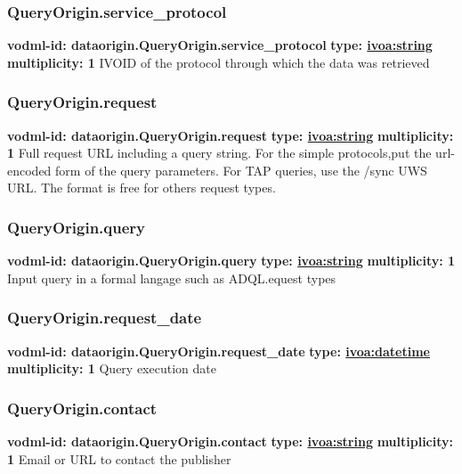     \subsubsection{QueryOrigin.service\_protocol}
      \textbf{vodml-id: dataorigin.QueryOrigin.service\_protocol} \newline
      \textbf{type: \hyperref[sect:ivoa]{ivoa:string}} \newline
      \textbf{multiplicity: 1} \newline
      IVOID \citep{2007ivoa.spec.0314P} of the protocol through which the data was retrieved

    \subsubsection{QueryOrigin.request}
      \textbf{vodml-id: dataorigin.QueryOrigin.request} \newline
      \textbf{type: \hyperref[sect:ivoa]{ivoa:string}} \newline
      \textbf{multiplicity: 1} \newline
      Full request URL including a query string. For the simple protocols,put the url-encoded form of the query parameters. For TAP queries, use the /sync UWS \citep{2016ivoa.spec.1024H} URL. The format is free for others request types.

    \subsubsection{QueryOrigin.query}
      \textbf{vodml-id: dataorigin.QueryOrigin.query} \newline
      \textbf{type: \hyperref[sect:ivoa]{ivoa:string}} \newline
      \textbf{multiplicity: 1} \newline
      Input query in a formal langage such as ADQL.equest types \citep{2023ivoa.spec.1215M}

    \subsubsection{QueryOrigin.request\_date}
      \textbf{vodml-id: dataorigin.QueryOrigin.request\_date} \newline
      \textbf{type: \hyperref[sect:ivoa]{ivoa:datetime}} \newline
      \textbf{multiplicity: 1} \newline
      Query execution date

    \subsubsection{QueryOrigin.contact}
      \textbf{vodml-id: dataorigin.QueryOrigin.contact} \newline
      \textbf{type: \hyperref[sect:ivoa]{ivoa:string}} \newline
      \textbf{multiplicity: 1} \newline
      Email or URL to contact the publisher